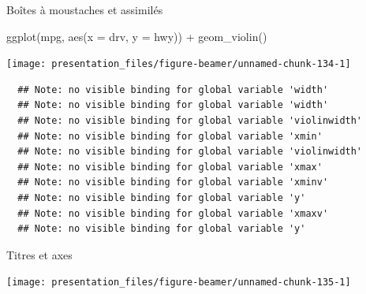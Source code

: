 \documentclass[12pt,ignorenonframetext,handout,]{beamer}
\newenvironment{Shaded}{}{}
\newcommand{\CharTok}[1]{\textcolor[rgb]{0.00,0.50,0.50}{#1}}
\newcommand{\DataTypeTok}[1]{#1}
\newcommand{\DecValTok}[1]{#1}
\newcommand{\KeywordTok}[1]{\textcolor[rgb]{0.00,0.00,1.00}{#1}}
\newcommand{\NormalTok}[1]{#1}
\newcommand{\OperatorTok}[1]{#1}
\newcommand{\StringTok}[1]{\textcolor[rgb]{0.00,0.50,0.50}{#1}}
\renewenvironment{Shaded}{\begin{snugshade}}{\end{snugshade}}
\begin{document}
\begin{frame}[fragile]{Boîtes à moustaches et assimilés}
\protect\hypertarget{boites-a-moustaches-et-assimiles-2}{}

\footnotesize \center

\begin{Shaded}
\begin{Highlighting}[]
\KeywordTok{ggplot}\NormalTok{(mpg, }\KeywordTok{aes}\NormalTok{(}\DataTypeTok{x =}\NormalTok{ drv, }\DataTypeTok{y =}\NormalTok{ hwy)) }\OperatorTok{+}\StringTok{ }
\StringTok{  }\KeywordTok{geom_violin}\NormalTok{()}
\end{Highlighting}
\end{Shaded}

\texttt{[image: presentation\_files/figure-beamer/unnamed-chunk-134-1]}

\begin{verbatim}
  ## Note: no visible binding for global variable 'width' 
  ## Note: no visible binding for global variable 'width' 
  ## Note: no visible binding for global variable 'violinwidth' 
  ## Note: no visible binding for global variable 'xmin' 
  ## Note: no visible binding for global variable 'violinwidth' 
  ## Note: no visible binding for global variable 'xmax' 
  ## Note: no visible binding for global variable 'xminv' 
  ## Note: no visible binding for global variable 'y' 
  ## Note: no visible binding for global variable 'xmaxv' 
  ## Note: no visible binding for global variable 'y'
\end{verbatim}

\end{frame}

\begin{frame}[fragile]{Titres et axes}
\protect\hypertarget{titres-et-axes}{}

\footnotesize \center

\begin{Shaded}
\end{Shaded}

\texttt{[image: presentation\_files/figure-beamer/unnamed-chunk-135-1]}

\end{frame}
\end{document}
